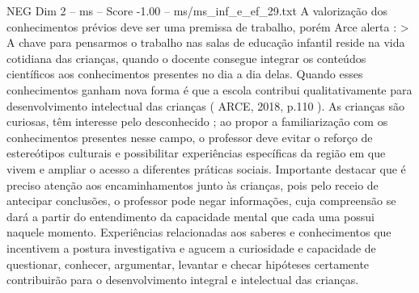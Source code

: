 \begin{textsample}{NEG Dim 2 – ms – Score -1.00 – ms/ms\_inf\_e\_ef\_29.txt}
A valorização dos conhecimentos prévios deve ser uma premissa de trabalho, porém Arce alerta : > A chave para pensarmos o trabalho nas salas de educação infantil reside na vida cotidiana das crianças, quando o docente consegue integrar os conteúdos científicos aos conhecimentos presentes no dia a dia delas.
Quando esses conhecimentos ganham nova forma é que a escola contribui qualitativamente para desenvolvimento intelectual das crianças ( ARCE, 2018, p.110 ).
As crianças são curiosas, têm interesse pelo desconhecido ; ao propor a familiarização com os conhecimentos presentes nesse campo, o professor deve evitar o reforço de estereótipos culturais e possibilitar experiências específicas da região em que vivem e ampliar o acesso a diferentes práticas sociais.
Importante destacar que é preciso atenção aos encaminhamentos junto às crianças, pois pelo receio de antecipar conclusões, o professor pode negar informações, cuja compreensão se dará a partir do entendimento da capacidade mental que cada uma possui naquele momento.
Experiências relacionadas aos saberes e conhecimentos que incentivem a postura investigativa e agucem a curiosidade e capacidade de questionar, conhecer, argumentar, levantar e checar hipóteses certamente contribuirão para o desenvolvimento integral e intelectual das crianças.

\end{textsample}
